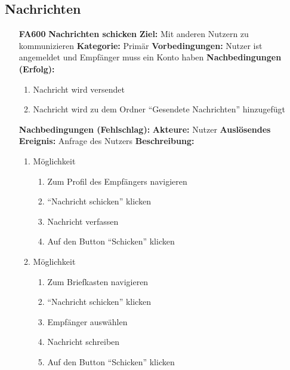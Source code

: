 \documentclass[parskip=full]{scrartcl}
\begin{document}
		\subsection{Nachrichten} \label{sec:FANachrichten}
		\begin{itemize}[nosep]
			\item[\textbf{FA600}]\textbf{Nachrichten schicken}
			\newline \textbf{Ziel:} Mit anderen Nutzern zu kommunizieren
			\newline \textbf{Kategorie:} Primär
			\newline \textbf{Vorbedingungen:} Nutzer ist angemeldet und Empfänger muss ein Konto haben
			\newline \textbf{Nachbedingungen (Erfolg):} 
			\begin{enumerate}[nosep]
				\item Nachricht wird versendet
				\item Nachricht wird zu dem Ordner “Gesendete Nachrichten” hinzugefügt
			\end{enumerate}
			\textbf{Nachbedingungen (Fehlschlag):}
			\newline \textbf{Akteure:} Nutzer
			\newline \textbf{Auslösendes Ereignis:} Anfrage des Nutzers
			\newline \textbf{Beschreibung:}
			\begin{enumerate}[nosep]
				\item Möglichkeit
				\begin{enumerate}[nosep]
					\item Zum Profil des Empfängers navigieren
					\item “Nachricht schicken” klicken
					\item Nachricht verfassen
					\item Auf den \gls{Button} “Schicken” klicken
				\end{enumerate}
				\item Möglichkeit
				\begin{enumerate}[nosep]
					\item Zum Briefkasten navigieren
					\item “Nachricht schicken” klicken
					\item Empfänger auswählen
					\item Nachricht schreiben
					\item Auf den \gls{Button} “Schicken” klicken\\
				\end{enumerate}
			\end{enumerate}
			

\end{itemize}
\end{document}
